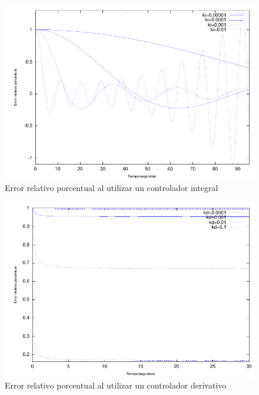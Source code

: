 \documentclass{sig-alternate}
\begin{document}
\begin{figure}[hp]
\label{errorMIntegral}
\centering
\includegraphics[scale=0.8]{graficos/errorMIntegral}
\caption{Error relativo porcentual al utilizar un controlador integral}
\end{figure}

\begin{figure}[hp]
\label{errorPorcentualMDerivativo}
\centering
\includegraphics[scale=0.8]{graficos/errorMDerivativo}
\caption{Error relativo porcentual al utilizar un controlador derivativo}
\end{figure}
\end{document}

